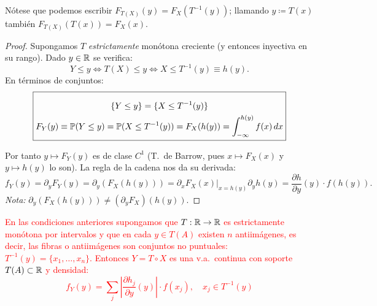 \begin{observacion}[9]
Nótese que podemos escribir $F_{T(X)}(y) = F_X(T^{-1}(y))$; llamando $y \coloneqq T(x)$ también $F_{T(X)}(T(x)) = F_X(x)$.
\end{observacion}

\begin{proof}
Supongamos $T$ \emph{estrictamente} monótona creciente (y entonces inyectiva en su rango). Dado $y \in \mathbb{R}$ se verifica:
\[
  Y \le y \iff T(X) \le y \iff X \le T^{-1}(y) \equiv h(y).
\]
En términos de conjuntos: 
\[
\boxed{
  \begin{gathered} \, \\[-3mm] 
  \{Y \le y\} = \{X \le T^{-1}(y)\} \\
F_Y(y) \equiv \mathbb{P}(Y \le y) = \mathbb{P}(X \le T^{-1}(y)) = F_X(h(y)) = \int_{-\infty}^{h(y)} f(x)\,dx\end{gathered}
}
\]

Por tanto $y \mapsto F_Y(y)$ es de clase $C^1$ (T.\ de Barrow, pues $x \mapsto F_X(x)$ y $y \mapsto h(y)$ lo son). La regla de la cadena nos da su derivada:
\[
  f_Y(y) = \partial_y F_Y(y) = \partial_y(F_X(h(y))) = \left.\partial_x F_X(x)\right|_{x=h(y)} \partial_y h(y) = \frac{\partial h}{\partial y}(y) \cdot f(h(y)).
\]
\emph{Nota:} $\partial_y(F_X(h(y))) \neq (\partial_y F_X)(h(y))$.
\end{proof}
\textcolor{red}{
\begin{proposicion}[24]
En las condiciones anteriores supongamos que $T : \mathbb{R} \to \mathbb{R}$ es estrictamente monótona por intervalos y que en cada $y \in T(A)$ existen $n$ antiimágenes, es decir, las fibras o antiimágenes son conjuntos no puntuales: $T^{-1}(y) = \{x_1, \dots, x_n\}$. Entonces $Y = T \circ X$ es una v.a.\ continua con soporte $T(A) \subset \mathbb{R}$ y densidad:
\begin{equation*}
  f_Y(y) = \sum_{j} \left|\frac{\partial h_j}{\partial y}(y)\right| \cdot f(x_j), \quad x_j \in T^{-1}(y)
\end{equation*}
\end{proposicion}}
